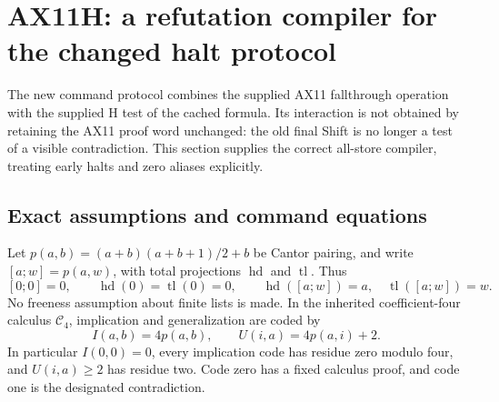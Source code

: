 \section{AX11H: a refutation compiler for the changed halt protocol}
\label{sec:ax11h-relative}

The new command protocol combines the supplied AX11 fallthrough operation
with the supplied H test of the cached formula.  Its interaction is not
obtained by retaining the AX11 proof word unchanged: the old final Shift
is no longer a test of a visible contradiction.  This section supplies the
correct all-store compiler, treating early halts and zero aliases explicitly.

\subsection{Exact assumptions and command equations}

Let $p(a,b)=(a+b)(a+b+1)/2+b$ be Cantor pairing, and write
$[a;w]=p(a,w)$, with total projections $\operatorname{hd}$ and
$\operatorname{tl}$.  Thus
\[
 [0;0]=0,\qquad\operatorname{hd}(0)=\operatorname{tl}(0)=0,
 \qquad \operatorname{hd}([a;w])=a,
 \quad\operatorname{tl}([a;w])=w.
\]
No freeness assumption about finite lists is made.  In the inherited
coefficient-four calculus $\mathcal C_4$, implication and generalization
are coded by
\[
 I(a,b)=4p(a,b),\qquad U(i,a)=4p(a,i)+2.
\]
In particular $I(0,0)=0$, every implication code has residue zero modulo
four, and $U(i,a)\geq2$ has residue two.  Code zero has a fixed calculus
proof, and code one is the designated contradiction.

